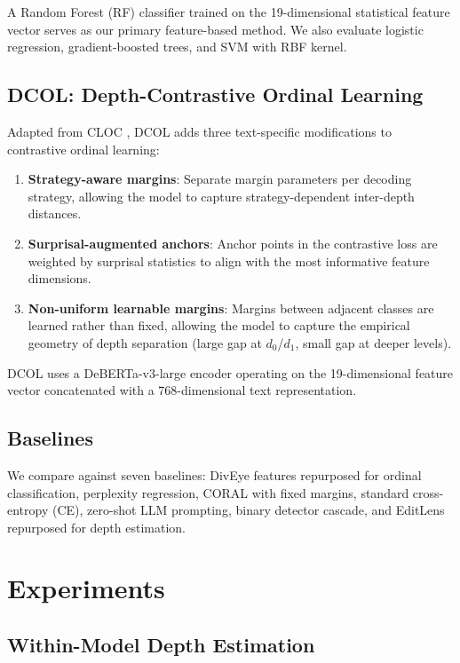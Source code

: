 \documentclass[11pt,a4paper]{article}
\begin{document}
A Random Forest (RF) classifier trained on the 19-dimensional statistical feature vector serves as our primary feature-based method.
We also evaluate logistic regression, gradient-boosted trees, and SVM with RBF kernel.

\subsection{DCOL: Depth-Contrastive Ordinal Learning}

Adapted from CLOC \citep{dai2025cloc}, DCOL adds three text-specific modifications to contrastive ordinal learning:
\begin{enumerate}
    \item \textbf{Strategy-aware margins}: Separate margin parameters per decoding strategy, allowing the model to capture strategy-dependent inter-depth distances.
    \item \textbf{Surprisal-augmented anchors}: Anchor points in the contrastive loss are weighted by surprisal statistics to align with the most informative feature dimensions.
    \item \textbf{Non-uniform learnable margins}: Margins between adjacent classes are learned rather than fixed, allowing the model to capture the empirical geometry of depth separation (large gap at $d_0$/$d_1$, small gap at deeper levels).
\end{enumerate}

DCOL uses a DeBERTa-v3-large encoder operating on the 19-dimensional feature vector concatenated with a 768-dimensional text representation.

\subsection{Baselines}

We compare against seven baselines: DivEye features repurposed for ordinal classification, perplexity regression, CORAL with fixed margins, standard cross-entropy (CE), zero-shot LLM prompting, binary detector cascade, and EditLens repurposed for depth estimation.

\section{Experiments}

\subsection{Within-Model Depth Estimation}
\end{document}
